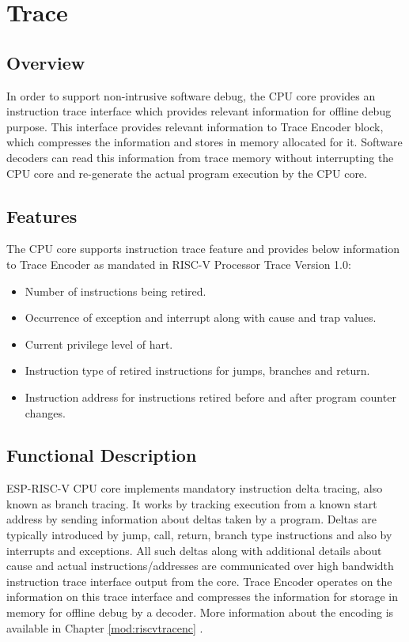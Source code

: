 \documentclass[main\_\_EN.tex]{subfiles}
\begin{document}



\clearpage
\section{Trace}
\label{sec:riscvcpu-trace}

\subsection{Overview}
\label{sec:riscvcpu-trace-overview}
In order to support non-intrusive software debug, the CPU core provides an instruction trace interface which provides relevant information for offline debug purpose. This interface provides relevant information to Trace Encoder block, which compresses the information and stores in memory allocated for it. Software decoders can read this information from trace memory without interrupting the CPU core and re-generate the actual program execution by the CPU core.


\subsection{Features}
\label{sec:riscvcpu-trace-features}

The CPU core supports instruction trace feature and provides below information to Trace Encoder as mandated in RISC-V Processor Trace Version 1.0:

\begin{itemize}
    \item Number of instructions being retired.
    \item Occurrence of exception and interrupt along with cause and trap values.
    \item Current privilege level of hart.
    \item Instruction type of retired instructions for jumps, branches and return.
    \item Instruction address for instructions retired before and after program counter changes.
\end{itemize}


\subsection{Functional Description}
\label{sec:riscvcpu-trace-func-descr}

ESP-RISC-V CPU core implements mandatory instruction delta tracing, also known as branch tracing. It works by tracking execution from a known start address by sending information about deltas taken by a program. Deltas are typically introduced by jump, call, return, branch type instructions and also by interrupts and exceptions. All such deltas along with additional details about cause and actual instructions/addresses are communicated over high bandwidth instruction trace interface output from the core. Trace Encoder operates on the information on this trace interface and compresses the information for storage in memory for offline debug by a decoder. More information about the encoding is available in Chapter \ref{mod:riscvtracenc} \textit{}.
\end{document}
